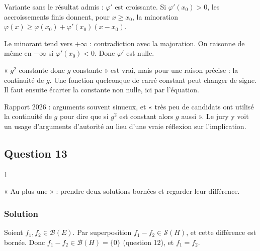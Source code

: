 \documentclass[11pt,a4paper]{article}
\begin{document}
\begin{methode}

Variante sans le résultat admis : \(\varphi'\) est croissante. Si \(\varphi'(x_0)>0\), les accroissements finis donnent, pour \(x\ge x_0\), la minoration \(\varphi(x)\ge\varphi(x_0)+\varphi'(x_0)(x-x_0)\).

Le minorant tend vers \(+\infty\) : contradiction avec la majoration. On raisonne de même en \(-\infty\) si \(\varphi'(x_0)<0\). Donc \(\varphi'\) est nulle.

\end{methode}

\begin{piege}

« \(g^2\) constante donc \(g\) constante » est vrai, mais pour une raison précise : la continuité de \(g\). Une fonction quelconque de carré constant peut changer de signe. Il faut ensuite écarter la constante non nulle, ici par l'équation.

\end{piege}

\begin{jury}

Rapport 2026 : arguments souvent sinueux, et « très peu de candidats ont utilisé la continuité de \(g\) pour dire que si \(g^2\) est constant alors \(g\) aussi ». Le jury y voit un usage d'arguments d'autorité au lieu d'une vraie réflexion sur l'implication.

\end{jury}

\hypertarget{question-13}{%
\subsection{Question 13}\label{question-13}}

\begin{indication}{1}

« Au plus une » : prendre deux solutions bornées et regarder leur différence.

\end{indication}

\hypertarget{solution-12}{%
\subsubsection{Solution}\label{solution-12}}

Soient \(f_1,f_2\in\mathcal B(E)\). Par superposition \(f_1-f_2\in\mathcal S(H)\), et cette différence est bornée. Donc \(f_1-f_2\in\mathcal B(H)=\{0\}\) (question 12), et \(f_1=f_2\).
\end{document}
